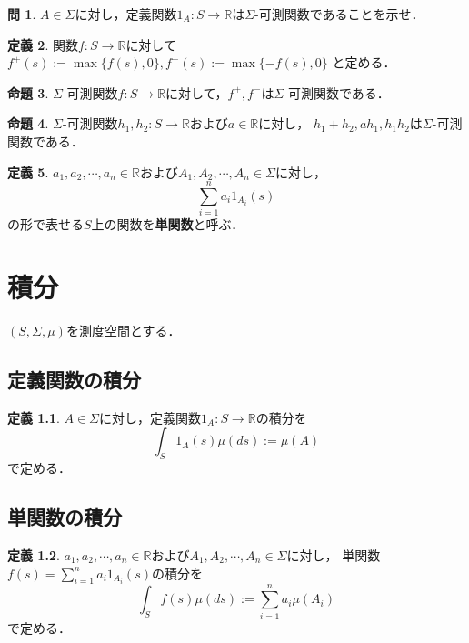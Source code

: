 \documentclass{jsreport}
\theoremstyle{definition}
\newtheorem{defi}{定義}[section]
\newtheorem{prop}[defi]{命題}
\newtheorem{qst}[defi]{問}
\begin{document}
\begin{qst}\label{qst_indicator_function_is_measurable}
$A\in\Sigma$に対し，定義関数$1_A \colon S\to\mathbb{R}$は$\Sigma$-可測関数であることを示せ．
\end{qst}

\begin{defi}\label{def_positive_and_negative_part}
関数$f \colon S\to\mathbb{R}$に対して
$f^+(s):=\max\{f(s),0\}, f^-(s):=\max\{-f(s),0\}$
と定める．
\end{defi}

\begin{prop}\label{prop_positive_and_negative_part_are_measurable}
$\Sigma$-可測関数$f \colon S\to\mathbb{R}$に対して，$f^+,f^-$は$\Sigma$-可測関数である．
\end{prop}

\begin{prop}\label{prop_measurable_function_and_arithmetic}
$\Sigma$-可測関数$h_1,h_2 \colon S\to\mathbb{R}$および$a\in\mathbb{R}$に対し，
$h_1+h_2, ah_1, h_1h_2$は$\Sigma$-可測関数である．
\end{prop}

\begin{defi}\label{def_simple_function}
$a_1,a_2,\cdots,a_n\in\mathbb{R}$および$A_1,A_2,\cdots,A_n\in\Sigma$に対し，
\[ \sum_{i=1}^n a_i1_{A_i}(s) \]
の形で表せる$S$上の関数を\textbf{単関数}と呼ぶ．
\end{defi}

\chapter{積分}

$(S,\Sigma,\mu)$を測度空間とする．

\section{定義関数の積分}

\begin{defi}\label{def_indicator_function_integral}
$A\in\Sigma$に対し，定義関数$1_A \colon S\to\mathbb{R}$の積分を
\[ \int_S 1_A(s)\mu(ds):=\mu(A) \]
で定める．
\end{defi}

\section{単関数の積分}

\begin{defi}\label{def_simple_function_integral}
$a_1,a_2,\cdots,a_n\in\mathbb{R}$および$A_1,A_2,\cdots,A_n\in\Sigma$に対し，
単関数$f(s)=\displaystyle\sum_{i=1}^n a_i1_{A_i}(s)$の積分を
\[ \int_S f(s)\mu(ds):=\sum_{i=1}^n a_i\mu(A_i) \]
で定める．
\end{defi}
\end{document}
